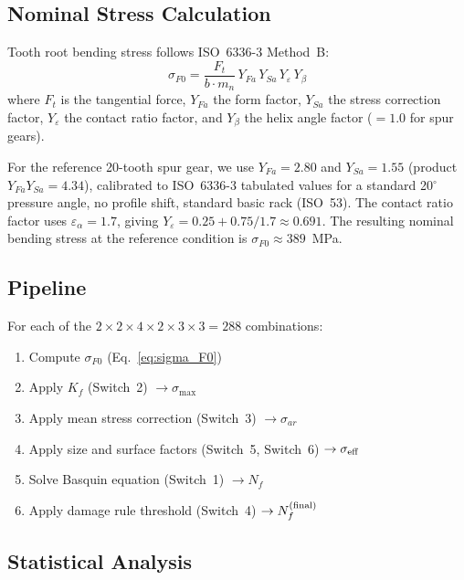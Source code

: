\documentclass[12pt,a4paper]{article}
\begin{document}
\subsection{Nominal Stress Calculation}

Tooth root bending stress follows ISO~6336-3 Method~B:
\begin{equation}
\label{eq:sigma_F0}
\sigma_{F0} = \frac{F_t}{b \cdot m_n} \,
Y_{Fa} \, Y_{Sa} \, Y_\varepsilon \, Y_\beta
\end{equation}
where $F_t$ is the tangential force, $Y_{Fa}$ the form factor,
$Y_{Sa}$ the stress correction factor, $Y_\varepsilon$ the contact ratio
factor, and $Y_\beta$ the helix angle factor ($=1.0$ for spur gears).

For the reference 20-tooth spur gear, we use $Y_{Fa}=2.80$ and
$Y_{Sa}=1.55$ (product $Y_{Fa}Y_{Sa}=4.34$), calibrated to ISO~6336-3
tabulated values for a standard 20$^\circ$ pressure angle, no profile
shift, standard basic rack (ISO~53). The contact ratio factor uses
$\varepsilon_\alpha = 1.7$, giving $Y_\varepsilon = 0.25 + 0.75/1.7
\approx 0.691$. The resulting nominal bending stress at the reference
condition is $\sigma_{F0} \approx 389$~MPa.

\subsection{Pipeline}

For each of the $2\times2\times4\times2\times3\times3 = 288$ combinations:
\begin{enumerate}
  \item Compute $\sigma_{F0}$ (Eq.~\ref{eq:sigma_F0})
  \item Apply $K_f$ (Switch~2) $\rightarrow \sigma_{\max}$
  \item Apply mean stress correction (Switch~3) $\rightarrow \sigma_{ar}$
  \item Apply size and surface factors (Switch~5, Switch~6)
        $\rightarrow \sigma_{\rm eff}$
  \item Solve Basquin equation (Switch~1) $\rightarrow N_f$
  \item Apply damage rule threshold (Switch~4) $\rightarrow N_f^{\rm (final)}$
\end{enumerate}

\subsection{Statistical Analysis}
\end{document}
